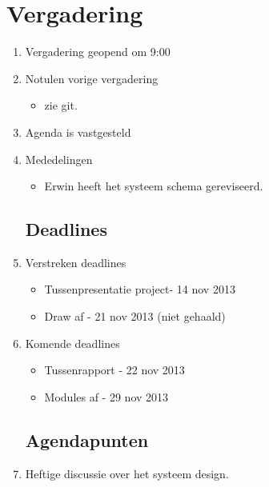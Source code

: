 \documentclass{article}
\begin{document}
\section*{Vergadering}
\begin{enumerate}
	
	\subsection*{Vooraf}
	\item Vergadering geopend om 9:00 %
	\item Notulen vorige vergadering
	\begin{itemize}
		\item zie git.
	\end{itemize}
	\item Agenda is vastgesteld
	\item Mededelingen
	\begin{itemize}
		\item Erwin heeft het systeem schema gereviseerd.
	\end{itemize}

	\subsection*{Deadlines}
	\item Verstreken deadlines
	\begin{itemize}
		\item Tussenpresentatie project- 14 nov 2013
		\item Draw af - 21 nov 2013 (niet gehaald)
	\end{itemize}
	\item Komende deadlines
	\begin{itemize}
		\item Tussenrapport - 22 nov 2013
		\item Modules af - 29 nov 2013		
	\end{itemize}

	\subsection*{Agendapunten}
	\item Heftige discussie over het systeem design.


\end{enumerate}
\end{document}

